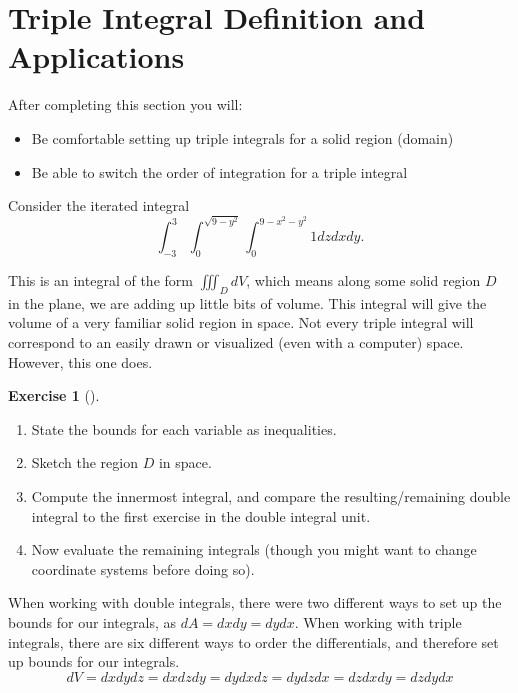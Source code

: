 \documentclass[10pt,]{book}
\theoremstyle{plain}
\theoremstyle{definition}
\theoremstyle{definition}
\theoremstyle{definition}
\theoremstyle{definition}
\newtheorem{exploration}[project]{Exercise}
\theoremstyle{definition}
\numberwithin{equation}{section}
\newcommand{\ds}{\displaystyle}
\begin{document}
\section[{Triple Integral Definition and Applications}]{Triple Integral Definition and Applications}\label{section-45}
After completing this section you will: \leavevmode%
\begin{itemize}[label=\textbullet]
\item{}Be comfortable setting up triple integrals for a solid region (domain)%
\item{}Be able to switch the order of integration for a triple integral%
\end{itemize}
%
\par
Consider the iterated integral%
\begin{equation*}
\ds \int_{-3}^3 \int_0^{\sqrt{9-y^2}}\int_0^{9-x^2-y^2} 1dzdxdy.
\end{equation*}
%
\par
This is an integral of the form \(\iiint_D dV\), which means along some solid region \(D\) in the plane, we are adding up little bits of volume. This integral will give the volume of a very familiar solid region in space. Not every triple integral will correspond to an easily drawn or visualized (even with a computer) space. However, this one does.%
\begin{exploration}[]\label{exploration-296}
\leavevmode%
\begin{enumerate}[font=\bfseries,label=(\alph*),ref=\alph*]
\item\label{task-807} State the bounds for each variable as inequalities.%
\item\label{task-808} Sketch the region \(D\) in space.%
\item\label{task-809} Compute the innermost integral, and compare the resulting/remaining double integral to the first exercise in the double integral unit.%
\item\label{task-810} Now evaluate the remaining integrals (though you might want to change coordinate systems before doing so).%
\end{enumerate}
\end{exploration}
When working with double integrals, there were two different ways to set up the bounds for our integrals, as \(dA=dxdy=dydx\). When working with triple integrals, there are six different ways to order the differentials, and therefore set up bounds for our integrals.%
\begin{equation*}
dV=dxdydz = dxdzdy = dydxdz=dydzdx=dzdxdy=dzdydx
\end{equation*}
\end{document}
